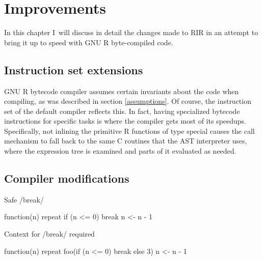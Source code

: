 \chapter{Improvements\label{improvements}}

In this chapter I~will discuss in detail the changes made to RIR in an attempt to bring it up to speed with GNU R byte-compiled code.


\section{Instruction set extensions}

GNU R bytecode compiler assumes certain invariants about the code when compiling, as was described in section \ref{assumptions}. Of course, the instruction set of the default compiler reflects this. In fact, having specialized bytecode instructions for specific tasks is where the compiler gets most of its speedups. Specifically, not inlining the primitive R functions of type \todo[verb]special causes the call mechanism to fall back to the same C routines that the AST interpreter uses, where the expression tree is examined and parts of it evaluated as needed.


\section{Compiler modifications}



\begin{listing}[htbp]
  \caption{\label{lst:local-break}Safe \rinline/break/}
  \begin{rcode}
function(n) {
    repeat {
        if (n <= 0) break
        n <- n - 1
    }
}
  \end{rcode}
\end{listing}

\begin{listing}[htbp]
  \caption{\label{lst:non-local-break}Context for \rinline/break/ required}
  \begin{rcode}
function(n) {
    repeat {
        foo(if (n <= 0) break else 3)
        n <- n - 1
    }
}
  \end{rcode}
\end{listing}


